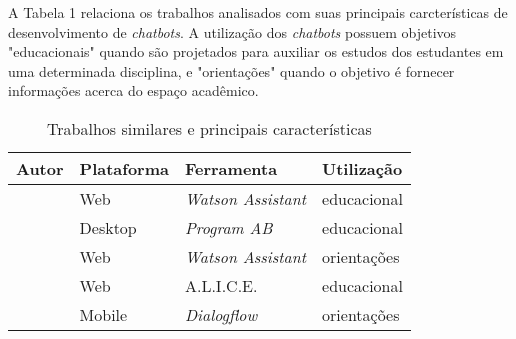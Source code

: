 \documentclass[12pt]{article}
\begin{document}
A Tabela 1 relaciona os trabalhos analisados com suas principais carcterísticas de desenvolvimento de {\itshape chatbots}. A utilização dos {\itshape chatbots} possuem objetivos "educacionais" quando são projetados para auxiliar os estudos dos estudantes em uma determinada disciplina, e "orientações" quando o objetivo é fornecer informações acerca do espaço acadêmico.

\begin{table}[h!]
\caption{Trabalhos similares e principais características}
\label{table:1}
\begin{tabular}{ |p{3cm}||p{3cm}|p{3cm}|p{3cm}|  }
 \hline
Autor & Plataforma & Ferramenta & Utilização\\
 \hline
 \cite{araujo:20}   & Web    & {\itshape Watson Assistant} &   educacional\\
 \cite{bulhoes:20}&   Desktop  & {\itshape Program AB}   & educacional\\
 \cite{catbot:19} & Web & {\itshape Watson Assistant} &  orientações\\
 \cite{lucchesi:18}    & Web & A.L.I.C.E. & educacional\\
 \cite{maciel:19}  & Mobile  & {\itshape Dialogflow} & orientações\\
 \hline
\end{tabular}
\end{table}











\end{document}
